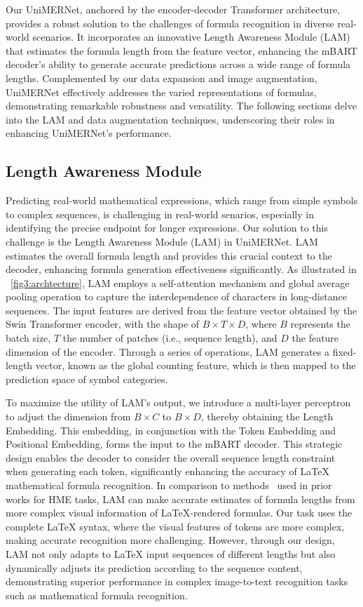 \documentclass[runningheads]{llncs}
\begin{document}
Our UniMERNet, anchored by the encoder-decoder Transformer architecture, provides a robust solution to the challenges of formula recognition in diverse real-world scenarios. It incorporates an innovative Length Awareness Module (LAM) that estimates the formula length from the feature vector, enhancing the mBART decoder's ability to generate accurate predictions across a wide range of formula lengths. Complemented by our data expansion and image augmentation, UniMERNet effectively addresses the varied representations of formulas, demonstrating remarkable robustness and versatility. 
The following sections delve into the LAM and data augmentation techniques, underscoring their roles in enhancing UniMERNet's performance.

\subsection{Length Awareness Module}

Predicting real-world mathematical expressions, which range from simple symbols to complex sequences, is challenging in real-world senarios, especially in identifying the precise endpoint for longer expressions. Our solution to this challenge is the Length Awareness Module (LAM) in UniMERNet. LAM estimates the overall formula length and provides this crucial context to the decoder, enhancing formula generation effectiveness significantly.
As illustrated in ~\cref{fig3:archtecture}, LAM employs a self-attention mechanism and global average pooling operation to capture the interdependence of characters in long-distance sequences. The input features are derived from the feature vector obtained by the Swin Transformer encoder, with the shape of $B \times T \times D$, where $B$ represents the batch size, $T$ the number of patches (i.e., sequence length), and $D$ the feature dimension of the encoder. Through a series of operations, LAM generates a fixed-length vector, known as the global counting feature, which is then mapped to the prediction space of symbol categories.


To maximize the utility of LAM's output, we introduce a multi-layer perceptron to adjust the dimension from $ B \times C$ to $ B \times D$, thereby obtaining the Length Embedding. This embedding, in conjunction with the Token Embedding and Positional Embedding, forms the input to the mBART decoder. This strategic design enables the decoder to consider the overall sequence length constraint when generating each token, significantly enhancing the accuracy of LaTeX mathematical formula recognition.
In comparison to methods~\cite{li2022counting} used in prior works for HME tasks, LAM can make accurate estimates of formula lengths from more complex visual information of LaTeX-rendered formulas. Our task uses the complete LaTeX syntax, where the visual features of tokens are more complex, making accurate recognition more challenging. However, through our design, LAM not only adapts to LaTeX input sequences of different lengths but also dynamically adjusts its prediction according to the sequence content, demonstrating superior performance in complex image-to-text recognition tasks such as mathematical formula recognition.
\end{document}
